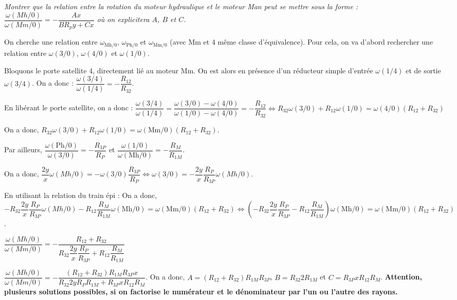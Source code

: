 \documentclass[10pt,fleqn]{article} %
\begin{document}
\begin{multicols}{2}
\begin{multicols}{2}
\subparagraph{}
\textit{Montrer que la relation entre la rotation du moteur hydraulique et le moteur Man peut se mettre sous la forme : $\dfrac{\omega(Mh/0)}{\omega(Mm/0)}=-\dfrac{Ax}{BR_py + Cx}$ où on explicitera $A$, $B$ et $C$.}


\ifprof
\newpage
\begin{corrige}
On cherche une relation entre $\omega_{\text{Mh}/0}$, $\omega_{\text{Ph}/0}$ et $\omega_{\text{Mm}/0}$ (avec Mm et 4 même classe d'équivalence). Pour cela, on va d'abord rechercher une relation entre $\omega(3/0)$, $\omega(4/0)$ et $\omega(1/0)$.

Bloquons le porte satellite 4, directement lié au moteur Mm. On est alors en présence d'un réducteur simple d'entrée  $\omega(1/4)$ et de sortie $\omega(3/4)$. On a donc : 
$\dfrac{\omega(3/4)}{\omega(1/4)} = -\dfrac{R_{12}}{R_{32}}$. 

En libérant le porte satellite, on a donc :
$ \dfrac{\omega(3/4)}{\omega(1/4)}
= \dfrac{\omega(3/0)-\omega(4/0)}{\omega(1/0)-\omega(4/0)}
= -\dfrac{R_{12}}{R_{32}}
\Leftrightarrow 
R_{32} \omega(3/0) +R_{12}\omega(1/0) = \omega(4/0)\left(R_{12}+R_{32}\right)$

On a donc, $R_{32} \omega(3/0) +R_{12}\omega(1/0) = \omega(\text{Mm}/0)\left(R_{12}+R_{32}\right)$.

Par ailleurs, $\dfrac{\omega(\text{Ph}/0)}{\omega(3/0)} = -\dfrac{R_{3P}}{R_P}$ et 
$\dfrac{\omega(1/0)}{\omega(\text{Mh}/0)} = -\dfrac{R_M}{R_{1M}}$.

On a donc, $ \dfrac{2y}{x} \omega(Mh/0)= -\omega(3/0)\dfrac{R_{3P}}{R_P} \Leftrightarrow  \omega(3/0) = -\dfrac{2y}{x} \dfrac{R_P}{R_{3P}}\omega(Mh/0)$.

En utilisant la relation du train épi :
On a donc, $-R_{32} \dfrac{2y}{x} \dfrac{R_P}{R_{3P}}\omega(Mh/0)  -R_{12} \dfrac{R_M}{R_{1M}} \omega(\text{Mh}/0) = \omega(\text{Mm}/0)\left(R_{12}+R_{32}\right) \Leftrightarrow \left(-R_{32} \dfrac{2y}{x} \dfrac{R_P}{R_{3P}}  -R_{12} \dfrac{R_M}{R_{1M}} \right)\omega(\text{Mh}/0) = \omega(\text{Mm}/0)\left(R_{12}+R_{32}\right)$.


$\dfrac{\omega(Mh/0)}{\omega(Mm/0)}=-\dfrac{R_{12}+R_{32}}{R_{32} \dfrac{2y}{x} \dfrac{R_P}{R_{3P}}  +R_{12} \dfrac{R_M}{R_{1M}}}$

$\dfrac{\omega(Mh/0)}{\omega(Mm/0)}=-\dfrac{\left( R_{12}+R_{32}\right)R_{1M} R_{3P}x }{R_{32} 2y R_PR_{1M} + R_{3P}xR_{12} R_M}$. 
On a donc, $A=\left( R_{12}+R_{32}\right)R_{1M} R_{3P}$, $B=R_{32} 2R_{1M}$ et $C= R_{3P}xR_{12} R_M$. 
\textbf{Attention, plusieurs solutions possibles, si on factorise le numérateur et le dénominateur par l'un ou l'autre des rayons.}
\end{corrige}
\else
\fi
%
%


\end{multicols}
\end{multicols}
\end{document}
